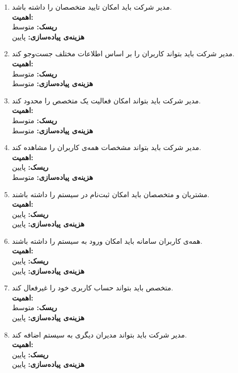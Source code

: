 \begin{enumerate}
	\item
	مدیر شرکت باید امکان تایید متخصصان را داشته باشد.
	\\
	\textbf{اهمیت:} 
	\\
	\textbf{ریسک:} متوسط
	\\
	\textbf{هزینه‌ی پیاده‌سازی:} پایین
	\item 
	مدیر شرکت باید بتواند کاربران را بر اساس اطلاعات مختلف جست‌وجو کند.
	\\
	\textbf{اهمیت:} 
	\\
	\textbf{ریسک:} متوسط
	\\
	\textbf{هزینه‌ی پیاده‌سازی:} متوسط
	\item 
	مدیر شرکت باید بتواند امکان فعالیت یک متخصص را محدود کند.
	\\
	\textbf{\textbf{اهمیت:}} 
	\\
	\textbf{ریسک:} متوسط
	\\
	\textbf{هزینه‌ی پیاده‌سازی:} متوسط
	
	
	\item
	مدیر شرکت باید بتواند مشخصات همه‌ی کاربران را مشاهده کند.
	\\
	\textbf{اهمیت:} 
	\\
	\textbf{ریسک:} پایین
	\\
	\textbf{هزینه‌ی پیاده‌سازی:} متوسط
	
\item 
مشتریان و متخصصان باید امکان ثبت‌نام در سیستم را داشته باشند.
 \\
\textbf{اهمیت:} 
\\
\textbf{ریسک:} پایین
 \\
\textbf{هزینه‌ی پیاده‌سازی:} پایین
\item
همه‌ی کاربران سامانه باید امکان ورود به سیستم را داشته باشند.
 \\
\textbf{اهمیت:} 
\\
\textbf{ریسک:} پایین
\\
\textbf{هزینه‌ی پیاده‌سازی:} پایین

\item 
متخصص باید بتواند حساب کاربری خود را غیرفعال کند.
\\
\textbf{اهمیت:} 
\\
\textbf{ریسک:} متوسط
\\
\textbf{هزینه‌ی پیاده‌سازی:} پایین

\item 
مدیر شرکت باید بتواند مدیران دیگری به سیستم اضافه کند.
\\
\textbf{اهمیت:} 
\\
\textbf{ریسک:} پایین
\\
\textbf{هزینه‌ی پیاده‌سازی:} پایین


\end{enumerate}
